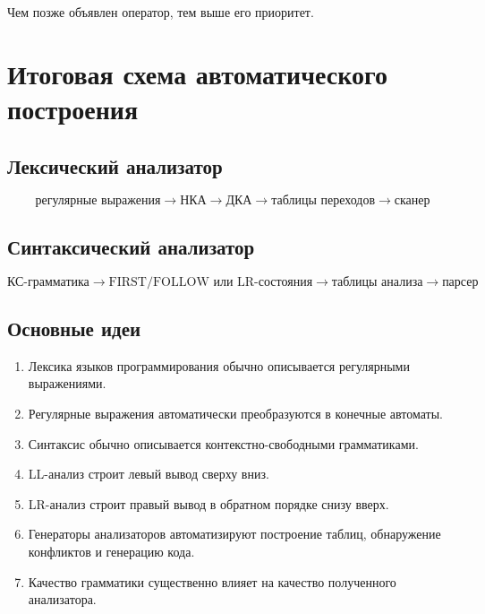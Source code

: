 \documentclass[12pt,a4paper]{article}
\begin{document}
Чем позже объявлен оператор, тем выше его приоритет.

\section{Итоговая схема автоматического построения}

\subsection{Лексический анализатор}

\[
\boxed{
\text{регулярные выражения}
\to
\text{НКА}
\to
\text{ДКА}
\to
\text{таблицы переходов}
\to
\text{сканер}
}
\]

\subsection{Синтаксический анализатор}

\[
\boxed{
\text{КС-грамматика}
\to
\text{FIRST/FOLLOW или LR-состояния}
\to
\text{таблицы анализа}
\to
\text{парсер}
}
\]

\subsection{Основные идеи}

\begin{enumerate}
    \item Лексика языков программирования обычно описывается регулярными выражениями.
    \item Регулярные выражения автоматически преобразуются в конечные автоматы.
    \item Синтаксис обычно описывается контекстно-свободными грамматиками.
    \item LL-анализ строит левый вывод сверху вниз.
    \item LR-анализ строит правый вывод в обратном порядке снизу вверх.
    \item Генераторы анализаторов автоматизируют построение таблиц, обнаружение конфликтов и генерацию кода.
    \item Качество грамматики существенно влияет на качество полученного анализатора.
\end{enumerate}
\end{document}
